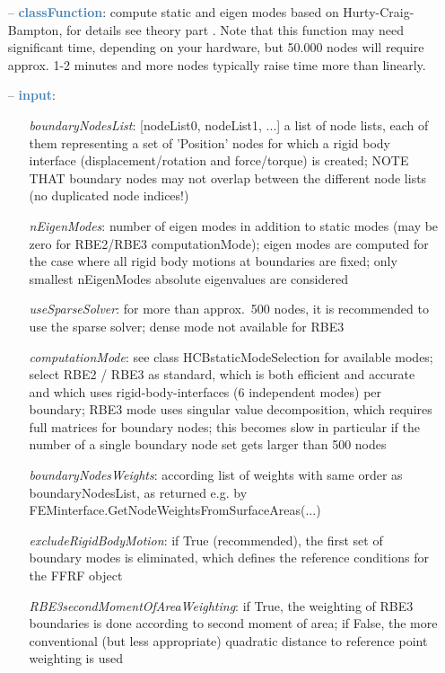 \begin{itemize}[leftmargin=1.4cm]
\begin{itemize}[leftmargin=1.4cm]
\begin{itemize}[leftmargin=0.5cm]
\begin{itemize}[leftmargin=1.4cm]
\begin{itemize}[leftmargin=1.4cm]
\begin{itemize}[leftmargin=0.5cm]
\begin{itemize}[leftmargin=0.7cm]
  \item[--]  \textcolor{steelblue}{\bf classFunction}: compute static  and eigen modes based on Hurty-Craig-Bampton, for details see theory part . Note that this function may need significant time, depending on your hardware, but 50.000 nodes will require approx. 1-2 minutes and more nodes typically raise time more than linearly.  \item[--]  \textcolor{steelblue}{\bf input}: \vspace{-6pt}
  \begin{itemize}[leftmargin=1.2cm]
\setlength{\itemindent}{-0.7cm}
    \item[] {\it boundaryNodesList}: [nodeList0, nodeList1, ...] a list of node lists, each of them representing a set of 'Position' nodes for which a rigid body interface (displacement/rotation and force/torque) is created; NOTE THAT boundary nodes may not overlap between the different node lists (no duplicated node indices!)
    \item[] {\it   nEigenModes}: number of eigen modes in addition to static modes (may be zero for RBE2/RBE3 computationMode); eigen modes are computed for the case where all rigid body motions at boundaries are fixed; only smallest nEigenModes absolute eigenvalues are considered
    \item[] {\it   useSparseSolver}: for more than approx.~500 nodes, it is recommended to use the sparse solver; dense mode not available for RBE3
    \item[] {\it   computationMode}: see class HCBstaticModeSelection for available modes; select RBE2 / RBE3 as standard, which is both efficient and accurate and which uses rigid-body-interfaces (6 independent modes) per boundary; RBE3 mode uses singular value decomposition, which requires full matrices for boundary nodes; this becomes slow in particular if the number of a single boundary node set gets larger than 500 nodes
    \item[] {\it   boundaryNodesWeights}: according list of weights with same order as boundaryNodesList, as returned e.g. by FEMinterface.GetNodeWeightsFromSurfaceAreas(...)
    \item[] {\it   excludeRigidBodyMotion}: if True (recommended), the first set of boundary modes is eliminated, which defines the reference conditions for the FFRF object
    \item[] {\it   RBE3secondMomentOfAreaWeighting}: if True, the weighting of RBE3 boundaries is done according to second moment of area; if False, the more conventional (but less appropriate) quadratic distance to reference point weighting is used

\end{itemize}
\end{itemize}
\end{itemize}
\end{itemize}
\end{itemize}
\end{itemize}
\end{itemize}
\end{itemize}
